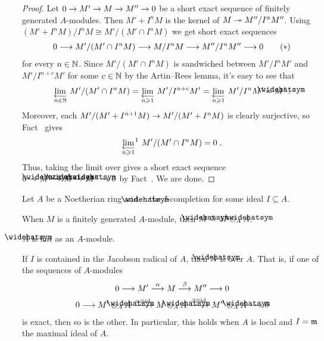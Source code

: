 \documentclass[a4paper,parskip=half,numbers=enddot, DIV=12]{scrreprt}
\renewcommand{\geq}{\geqslant}
\begin{document}
\begin{proof}
	Let $0\morphism M'\morphism M\morphism M''\morphism 0$ be a short exact sequence of finitely generated $A$-modules. Then $M'+I^nM$ is the kernel of $M\epimorphism M''/I^nM''$. Using $(M'+I^nM)/I^nM\cong M'/(M'\cap I^nM)$ we get short exact sequences
	\begin{align}\lbl{eq:completion}
		0\morphism M'/(M'\cap I^nM)\morphism M/I^nM\morphism M''/I^nM''\morphism 0\tag{$*$}
	\end{align}
	for every $n\in\mathbb{N}$. Since $M'/(M'\cap I^nM)$ is sandwiched between $M'/I^nM'$ and $M'/I^{n+c}M'$ for some $c\in\mathbb{N}$ by the Artin--Rees lemma, it's easy to see that 
	\begin{align*}
		\limit[n\in \IN] M'/(M'\cap I^nM)=\limit[n\geq 1]M'/I^{n+c}M'=\limit[n\geq 1]M'/I^nM'=\roof{M}'\;. 
	\end{align*}
	Moreover, each $M'/(M'+I^{n+1}M)\morphism M'/(M'+I^nM)$ is clearly surjective, so Fact~ gives 
	\begin{align*}
		\limit[n\geq 1][^1]M'/(M'\cap I^nM)=0\;.
	\end{align*}
	Thus, taking the limit over  gives a short exact sequence $0\morphism \roof{M}'\morphism \roof{M}\morphism\roof{M}''\morphism 0$ by Fact~. We are done.
\end{proof}
\begin{cor}
	Let $A$ be a Noetherian ring and $\roof{\phantom{x}}$ the $I$-completion for some ideal $I\subseteq A$.
	\begin{alphanumerate}
		\item When $M$ is a finitely generated $A$-module, then $\roof{M}\cong M\otimes_A\roof{A}$.
		\item $\roof{A}$ is flat as an $A$-module.
		\item If $I$ is contained in the Jacobson radical of $A$, then $\roof{A}$ is  over $A$. That is, if one of the sequences of $A$-modules
		\begin{gather*}
			0\morphism M'\morphism[\alpha] M\morphism[\beta] M''\morphism 0\\
			0\morphism M'\otimes_A\roof{A}\xrightarrow{\alpha\otimes\id} M\otimes_A\roof{A}\xrightarrow{\beta\otimes\id} M''\otimes_A\roof{A}\morphism 0
		\end{gather*}
		is exact, then so is the other. In particular, this holds when $A$ is local and $I=\mathfrak{m}$ the maximal ideal of $A$.%
	\end{alphanumerate}
\end{cor}
\end{document}
